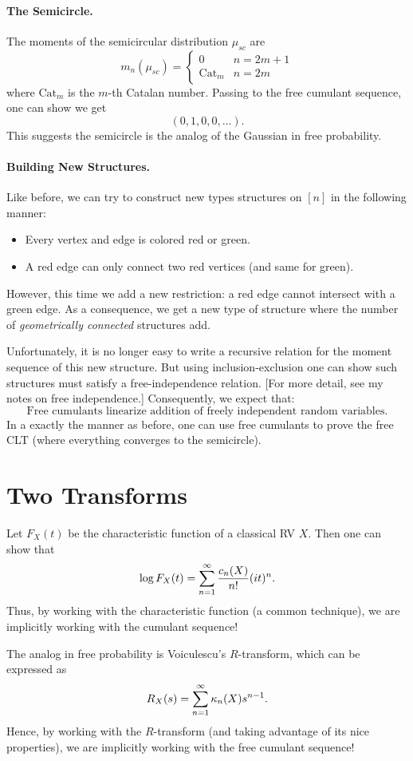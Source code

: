 \paragraph{The Semicircle.} The moments of the semicircular distribution $\mu_{sc}$ are
\[
    m_n\left(\mu_{sc}\right) =
    \begin{cases}
        0            & n = 2m + 1 \\
        \text{Cat}_m & n = 2m
    \end{cases}
\]
where $\text{Cat}_m$ is the $m$-th Catalan number. Passing to the free cumulant sequence, one can show we get
\[
    (0, 1, 0, 0, \dots).
\]
This suggests the semicircle is the analog of the Gaussian in free probability.

\paragraph{Building New Structures.} Like before, we can try to construct new types structures on $[n]$ in the following manner:
\begin{itemize}
    \item Every vertex and edge is colored red or green.
    \item A red edge can only connect two red vertices (and same for green).
\end{itemize}
However, this time we add a new restriction: a red edge cannot intersect with a green edge. As a consequence, we get a new type of structure where the number of \textit{geometrically connected} structures add.

Unfortunately, it is no longer easy to write a recursive relation for the moment sequence of this new structure. But using inclusion-exclusion one can show such structures must satisfy a free-independence relation. [For more detail, see my notes on free independence.] Consequently, we expect that:
\[
    \boxed{\text{Free cumulants linearize addition of freely independent random variables.}}
\]
In a exactly the manner as before, one can use free cumulants to prove the free CLT (where everything converges to the semicircle).

\section*{Two Transforms}
Let $F_X(t)$ be the characteristic function of a classical RV $X$. Then one can show that
\[
    \log F_X(t) = \sum_{n=1}^\infty \frac{c_n(X)}{n!}(it)^n.
\]
Thus, by working with the characteristic function (a common technique), we are implicitly working with the cumulant sequence!

The analog in free probability is Voiculescu's $R$-transform, which can be expressed as
\[
    R_X(s) = \sum_{n = 1}^\infty \kappa_n(X)s^{n-1}.
\]
Hence, by working with the $R$-transform (and taking advantage of its nice properties), we are implicitly working with the free cumulant sequence!

